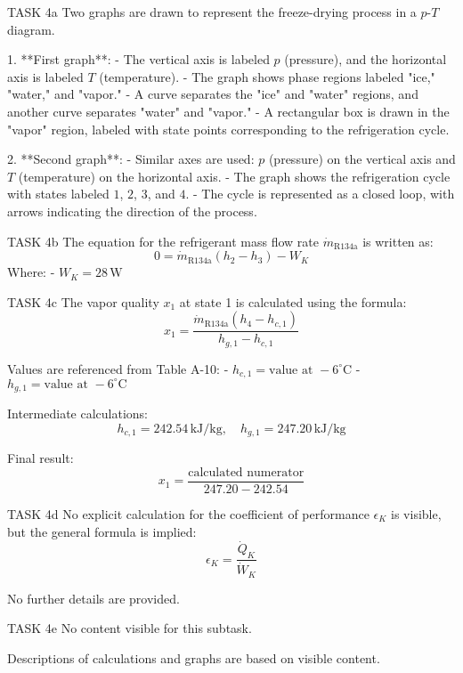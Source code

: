 TASK 4a  
Two graphs are drawn to represent the freeze-drying process in a \( p \)-\( T \) diagram.  

1. **First graph**:  
   - The vertical axis is labeled \( p \) (pressure), and the horizontal axis is labeled \( T \) (temperature).  
   - The graph shows phase regions labeled "ice," "water," and "vapor."  
   - A curve separates the "ice" and "water" regions, and another curve separates "water" and "vapor."  
   - A rectangular box is drawn in the "vapor" region, labeled with state points corresponding to the refrigeration cycle.  

2. **Second graph**:  
   - Similar axes are used: \( p \) (pressure) on the vertical axis and \( T \) (temperature) on the horizontal axis.  
   - The graph shows the refrigeration cycle with states labeled \( 1 \), \( 2 \), \( 3 \), and \( 4 \).  
   - The cycle is represented as a closed loop, with arrows indicating the direction of the process.  

TASK 4b  
The equation for the refrigerant mass flow rate \( \dot{m}_{\text{R134a}} \) is written as:  
\[
0 = \dot{m}_{\text{R134a}} (h_2 - h_3) - W_K
\]  
Where:  
- \( W_K = 28 \, \text{W} \)  

TASK 4c  
The vapor quality \( x_1 \) at state 1 is calculated using the formula:  
\[
x_1 = \frac{\dot{m}_{\text{R134a}} (h_4 - h_{c,1})}{h_{g,1} - h_{c,1}}
\]  

Values are referenced from Table A-10:  
- \( h_{c,1} = \text{value at } -6^\circ\text{C} \)  
- \( h_{g,1} = \text{value at } -6^\circ\text{C} \)  

Intermediate calculations:  
\[
h_{c,1} = 242.54 \, \text{kJ/kg}, \quad h_{g,1} = 247.20 \, \text{kJ/kg}
\]  

Final result:  
\[
x_1 = \frac{\text{calculated numerator}}{247.20 - 242.54}
\]  

TASK 4d  
No explicit calculation for the coefficient of performance \( \epsilon_K \) is visible, but the general formula is implied:  
\[
\epsilon_K = \frac{\dot{Q}_K}{\dot{W}_K}
\]  

No further details are provided.  

TASK 4e  
No content visible for this subtask.  

Descriptions of calculations and graphs are based on visible content.